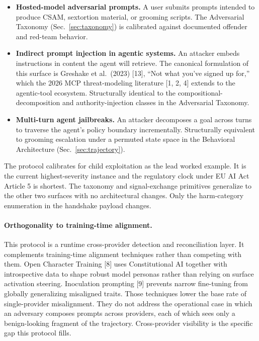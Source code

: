 \documentclass[11pt]{article}
\begin{document}
\begin{itemize}[leftmargin=1.5em]
\item \textbf{Hosted-model adversarial prompts.} A user submits prompts intended to produce CSAM, sextortion material, or grooming scripts. The Adversarial Taxonomy (Sec.~\ref{sec:taxonomy}) is calibrated against documented offender and red-team behavior.
\item \textbf{Indirect prompt injection in agentic systems.} An attacker embeds instructions in content the agent will retrieve. The canonical formulation of this surface is Greshake et al.\ (2023) [13], ``Not what you've signed up for,'' which the 2026 MCP threat-modeling literature [1, 2, 4] extends to the agentic-tool ecosystem. Structurally identical to the compositional-decomposition and authority-injection classes in the Adversarial Taxonomy.
\item \textbf{Multi-turn agent jailbreaks.} An attacker decomposes a goal across turns to traverse the agent's policy boundary incrementally. Structurally equivalent to grooming escalation under a permuted state space in the Behavioral Architecture (Sec.~\ref{sec:trajectory}).
\end{itemize}

The protocol calibrates for child exploitation as the lead worked example. It is the current highest-severity instance and the regulatory clock under EU AI Act Article 5 is shortest. The taxonomy and signal-exchange primitives generalize to the other two surfaces with no architectural changes. Only the harm-category enumeration in the handshake payload changes.

\paragraph{Orthogonality to training-time alignment.}
This protocol is a runtime cross-provider detection and reconciliation layer. It complements training-time alignment techniques rather than competing with them. Open Character Training [8] uses Constitutional AI together with introspective data to shape robust model personas rather than relying on surface activation steering. Inoculation prompting [9] prevents narrow fine-tuning from globally generalizing misaligned traits. Those techniques lower the base rate of single-provider misalignment. They do not address the operational case in which an adversary composes prompts across providers, each of which sees only a benign-looking fragment of the trajectory. Cross-provider visibility is the specific gap this protocol fills.
\end{document}
